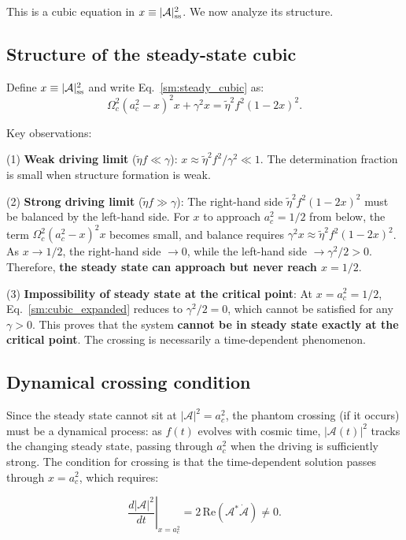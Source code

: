 \documentclass[aps,prd,onecolumn]{revtex4-2}
\begin{document}
This is a cubic equation in $x \equiv |\mathcal{A}|^2_{\rm ss}$. We now analyze its structure.

\subsection{Structure of the steady-state cubic}

Define $x \equiv |\mathcal{A}|^2_{\rm ss}$ and write Eq.~\eqref{sm:steady_cubic} as:
\begin{equation}
\Omega_c^2(a_c^2 - x)^2 x + \gamma^2 x = \tilde{\eta}^2 f^2 (1-2x)^2.
\label{sm:cubic_expanded}
\end{equation}

Key observations:

(1) \textbf{Weak driving limit} ($\tilde{\eta}f \ll \gamma$): $x \approx \tilde{\eta}^2 f^2 / \gamma^2 \ll 1$. The determination fraction is small when structure formation is weak.

(2) \textbf{Strong driving limit} ($\tilde{\eta}f \gg \gamma$): The right-hand side $\tilde{\eta}^2 f^2 (1-2x)^2$ must be balanced by the left-hand side. For $x$ to approach $a_c^2 = 1/2$ from below, the term $\Omega_c^2(a_c^2 - x)^2 x$ becomes small, and balance requires $\gamma^2 x \approx \tilde{\eta}^2 f^2 (1-2x)^2$. As $x \to 1/2$, the right-hand side $\to 0$, while the left-hand side $\to \gamma^2/2 > 0$. Therefore, \textbf{the steady state can approach but never reach $x = 1/2$}.

(3) \textbf{Impossibility of steady state at the critical point}: At $x = a_c^2 = 1/2$, Eq.~\eqref{sm:cubic_expanded} reduces to $\gamma^2/2 = 0$, which cannot be satisfied for any $\gamma > 0$. This proves that the system \textbf{cannot be in steady state exactly at the critical point}. The crossing is necessarily a time-dependent phenomenon.

\subsection{Dynamical crossing condition}

Since the steady state cannot sit at $|\mathcal{A}|^2 = a_c^2$, the phantom crossing (if it occurs) must be a dynamical process: as $f(t)$ evolves with cosmic time, $|\mathcal{A}(t)|^2$ tracks the changing steady state, passing through $a_c^2$ when the driving is sufficiently strong. The condition for crossing is that the time-dependent solution passes through $x = a_c^2$, which requires:

\begin{equation}
\left.\frac{d|\mathcal{A}|^2}{dt}\right|_{x=a_c^2} = 2\,\mathrm{Re}(\mathcal{A}^* \dot{\mathcal{A}}) \neq 0.
\end{equation}
\end{document}
